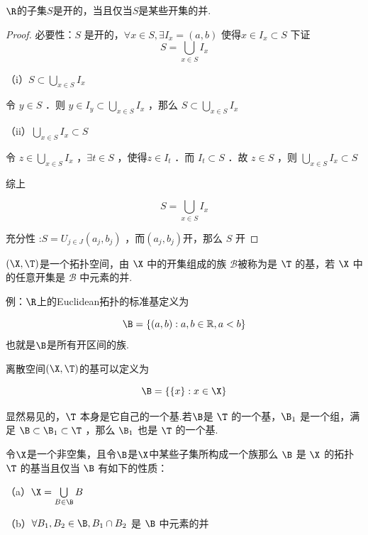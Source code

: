 \begin{theorem}
	$\R$的子集$S$是开的，当且仅当$S$是某些开集的并.
\end{theorem}
\begin{proof}
	必要性：$S$ 是开的，$\forall x \in S, \exists I_x=(a, b)$ 使得$x \in I_x \subset S$ 下证
	$$S=\bigcup_{x \in S} I_x$$
	
	（i）$S \subset \bigcup_{x \in S}I_x$
	
	令 $y \in S$ ．则 $y \in I_y \subset \bigcup_{x \in S} I_x$ ，那么 $S \subset \bigcup_{x \in S} I_x$
	
	（ii）$\bigcup_{x \in S }I_x \subset S$
	
	令 $z \in \bigcup_{x \in S} I_x$ ，$\exists t \in S$ ，使得$z \in I_t$ ．而 $I_t \subset S$ ．故 $z \in S$ ，则 $\bigcup_{x \in S} I_x\subset S$
	
	综上
	
	$$
	S=\bigcup_{x \in S} I_x
	$$
	
	
	充分性 :$S=U_{j \in J}\left(a_j, b_j\right)$ ，而$\left(a_j, b_j \right)$开，那么 $S$ 开
\end{proof}
\begin{definition}
	$\left(\X,\T\right)$是一个拓扑空间，由 $\X$ 中的开集组成的族 $\mathcal{B}$被称为是 $\T$ 的基，若 $\X$ 中的任意开集是 $\mathcal{B}$ 中元素的并.
\end{definition}
例：$\R$上的Euclidean拓扑的标准基定义为

$$
\B=\{(a, b): a, b \in \mathbb{R}, a<b\}
$$
也就是$\B$是所有开区间的族.

离散空间$\left(\X,\T\right)$的基可以定义为

$$
\B=\{\{x\}: x \in \X\}
$$

显然易见的，$\T$ 本身是它自己的一个基.若$\B$是 $\T$ 的一个基，$\B_1$ 是一个组，满足 $\B \subset \B_1 \subset \T$ ，那么 $\B_1$ 也是 $\T$ 的一个基.

\begin{proposition}
	\label{eq_of_2def_tpbas}
	令$\X$是一个非空集，且令$\B$是$\X$中某些子集所构成一个族那么 $\B$ 是 $\X$ 的拓扑 $\T$ 的基当且仅当 $\B$ 有如下的性质：
	
	（a）$\X=\bigcup\limits_{B \in \B }B$
	
	（b）$\forall B_1, B_2 \in \B, B_1 \cap B_2$ 是 $\B$ 中元素的并
\end{proposition}


